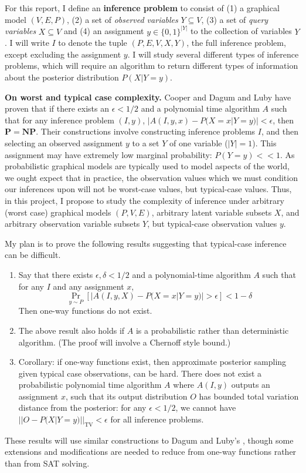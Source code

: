 \documentclass{article}
\renewcommand{\P}{\mathbf{P}}
\newcommand{\NP}{\mathbf{NP}}
\begin{document}
For this report, I define an \textbf{inference problem} to consist of (1) a graphical model $(V, E, P)$, (2) a set of \textit{observed variables} $Y \subseteq V$, (3) a set of \textit{query variables} $X \subseteq V$ and (4) an assignment $y \in \{0, 1\}^{|Y|}$ to the collection of variables $Y$.
I will write $I$ to denote the tuple $(P, E, V, X, Y)$, the full inference problem, except excluding the assignment $y$.
I will study several different types of inference problems, which will require an algorithm to return different types of information about the posterior distribution $P(X | Y = y)$.

\textbf{On worst and typical case complexity.} Cooper \cite{cooper1990} and Dagum and Luby \cite{dagum1993} have proven that if there exists an $\epsilon < 1/2$ and a polynomial time algorithm $A$ such that for any inference problem $(I, y)$, $|A(I, y, x) - P(X = x | Y = y)| < \epsilon$, then $\P = \NP$.
Their constructions involve constructing inference problems $I$, and then selecting an observed assignment $y$ to a set $Y$ of one variable ($|Y| = 1$).
This assignment may have extremely low marginal probability: $P(Y = y) << 1$.
As probabilistic graphical models are typically used to model aspects of the world, we ought expect that in practice, the observation values which we must condition our inferences upon will not be worst-case values, but typical-case values.
Thus, in this project, I propose to study the complexity of inference under arbitrary (worst case) graphical models $(P, V, E)$, arbitrary latent variable subsets $X$, and arbitrary observation variable subsets $Y$, but typical-case observation values $y$.

My plan is to prove the following results suggesting that typical-case inference can be difficult.
\begin{enumerate}
    \item Say that there exists $\epsilon, \delta < 1/2$ and a polynomial-time algorithm $A$ such that for any $I$ and any assignment $x$, $$\Pr_{y \sim P}[|A(I, y, X) - P(X = x | Y = y)| > \epsilon] < 1 - \delta$$ Then one-way functions do not exist.
    \item The above result also holds if $A$ is a probabilistic rather than deterministic algorithm.  (The proof will involve a Chernoff style bound.)
    \item Corollary: if one-way functions exist, then approximate posterior sampling given typical case observations, can be hard.  There does not exist a probabilistic polynomial time algorithm $A$ where $A(I, y)$ outputs an assignment $x$, such that its output distribution $O$ has bounded total variation distance from the posterior: for any $\epsilon < 1/2$, we cannot have $||O - P(X | Y = y)||_{\text{TV}} < \epsilon$ for all inference problems.
\end{enumerate}
These results will use similar constructions to Dagum and Luby's \cite{dagum1993}, though some extensions and modifications are needed to reduce from one-way functions rather than from SAT solving.
\end{document}
